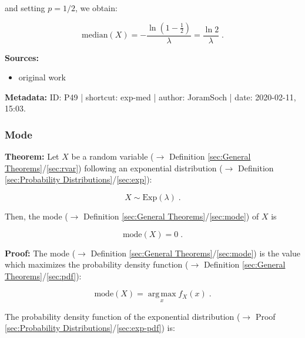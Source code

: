 \documentclass[a4paper,12pt,twoside]{book}
\begin{document}
and setting $p = 1/2$, we obtain:

\begin{equation} \label{eq:exp-med-exp-med-qed}
\mathrm{median}(X) = -\frac{\ln(1-\frac{1}{2})}{\lambda} = \frac{\ln 2}{\lambda} \; .
\end{equation}


\vspace{1em}
\textbf{Sources:}
\begin{itemize}
\item original work\end{itemize}


\vspace{1em}
\textbf{Metadata:} ID: P49 | shortcut: exp-med | author: JoramSoch | date: 2020-02-11, 15:03.
\vspace{1em}



\subsubsection[\textbf{Mode}]{Mode} \label{sec:exp-mode}
\setcounter{equation}{0}

\textbf{Theorem:} Let $X$ be a random variable ($\rightarrow$ Definition \ref{sec:General Theorems}/\ref{sec:rvar}) following an exponential distribution ($\rightarrow$ Definition \ref{sec:Probability Distributions}/\ref{sec:exp}):

\begin{equation} \label{eq:exp-mode-exp}
X \sim \mathrm{Exp}(\lambda) \; .
\end{equation}

Then, the mode ($\rightarrow$ Definition \ref{sec:General Theorems}/\ref{sec:mode}) of $X$ is

\begin{equation} \label{eq:exp-mode-exp-mode}
\mathrm{mode}(X) = 0 \; .
\end{equation}


\vspace{1em}
\textbf{Proof:}  The mode ($\rightarrow$ Definition \ref{sec:General Theorems}/\ref{sec:mode}) is the value which maximizes the probability density function ($\rightarrow$ Definition \ref{sec:General Theorems}/\ref{sec:pdf}):

\begin{equation} \label{eq:exp-mode-mode}
\mathrm{mode}(X) = \operatorname*{arg\,max}_x f_X(x) \; .
\end{equation}

The probability density function of the exponential distribution ($\rightarrow$ Proof \ref{sec:Probability Distributions}/\ref{sec:exp-pdf}) is:
\end{document}
